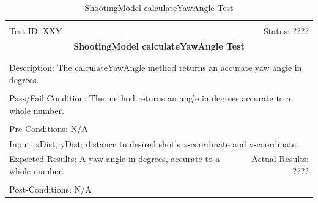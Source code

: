 \documentclass[11pt]{article}
\begin{document}
\begin{center}
\begin{table}[H]
\begin{tabular}{|l r|}\hline&\\[-2mm]
	Test ID: XXY	&Status: ????\\[-3mm]
	\multicolumn{2}{|c|}{\textbf{\large{ShootingModel calculateYawAngle Test}}}\\&\\\hline&\\[-3mm]
	\multicolumn{2}{|p{\textwidth}|}{Description: The calculateYawAngle method returns an accurate yaw angle in degrees.}\\[1mm]\hline&\\[-3mm]
	\multicolumn{2}{|p{\textwidth}|}{Pass/Fail Condition: The method returns an angle in degrees accurate to a whole number.}\\[1mm]\hline&\\[-3mm]
	\multicolumn{2}{|p{\textwidth}|}{Pre-Conditions: N/A}\\[4mm]
	\multicolumn{2}{|p{\textwidth}|}{Input: xDist, yDist; distance to desired shot's x-coordinate and y-coordinate.}\\[2mm]\hline
	\multicolumn{1}{|p{0.49\textwidth}}{Expected Results: A yaw angle in degrees, accurate to a whole number.}	&\multicolumn{1}{|p{0.45\textwidth}|}{Actual Results: ????}\\\hline&\\[-3mm]
	\multicolumn{2}{|p{\textwidth}|}{Post-Conditions: N/A}\\\hline
\end{tabular}
\caption{ShootingModel calculateYawAngle Test}
\end{table}
\end{center}
\end{document}

